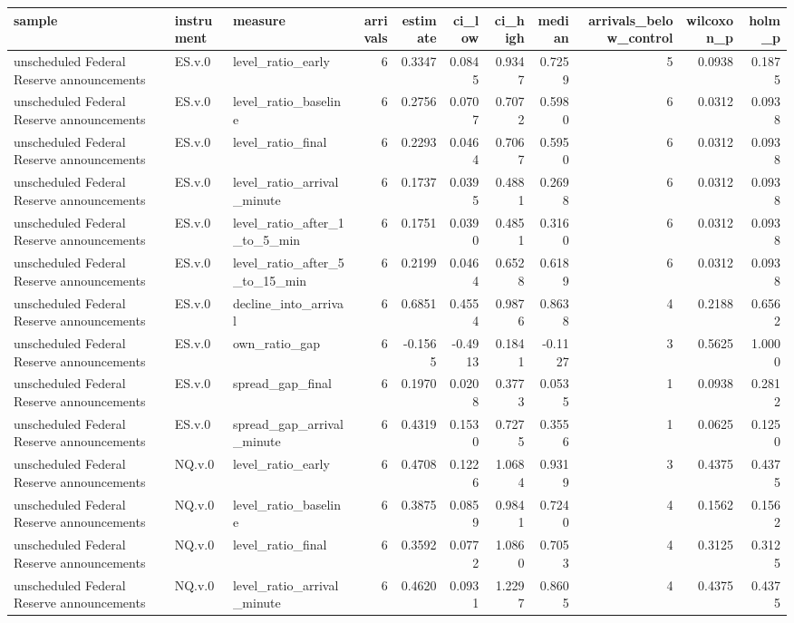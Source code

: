 \begin{tabular}{lllrrrrrrrr}
\toprule
sample & instrument & measure & arrivals & estimate & ci_low & ci_high & median & arrivals_below_control & wilcoxon_p & holm_p \\
\midrule
unscheduled Federal Reserve announcements & ES.v.0 & level_ratio_early & 6 & 0.3347 & 0.0845 & 0.9347 & 0.7259 & 5 & 0.0938 & 0.1875 \\
unscheduled Federal Reserve announcements & ES.v.0 & level_ratio_baseline & 6 & 0.2756 & 0.0707 & 0.7072 & 0.5980 & 6 & 0.0312 & 0.0938 \\
unscheduled Federal Reserve announcements & ES.v.0 & level_ratio_final & 6 & 0.2293 & 0.0464 & 0.7067 & 0.5950 & 6 & 0.0312 & 0.0938 \\
unscheduled Federal Reserve announcements & ES.v.0 & level_ratio_arrival_minute & 6 & 0.1737 & 0.0395 & 0.4881 & 0.2698 & 6 & 0.0312 & 0.0938 \\
unscheduled Federal Reserve announcements & ES.v.0 & level_ratio_after_1_to_5_min & 6 & 0.1751 & 0.0390 & 0.4851 & 0.3160 & 6 & 0.0312 & 0.0938 \\
unscheduled Federal Reserve announcements & ES.v.0 & level_ratio_after_5_to_15_min & 6 & 0.2199 & 0.0464 & 0.6528 & 0.6189 & 6 & 0.0312 & 0.0938 \\
unscheduled Federal Reserve announcements & ES.v.0 & decline_into_arrival & 6 & 0.6851 & 0.4554 & 0.9876 & 0.8638 & 4 & 0.2188 & 0.6562 \\
unscheduled Federal Reserve announcements & ES.v.0 & own_ratio_gap & 6 & -0.1565 & -0.4913 & 0.1841 & -0.1127 & 3 & 0.5625 & 1.0000 \\
unscheduled Federal Reserve announcements & ES.v.0 & spread_gap_final & 6 & 0.1970 & 0.0208 & 0.3773 & 0.0535 & 1 & 0.0938 & 0.2812 \\
unscheduled Federal Reserve announcements & ES.v.0 & spread_gap_arrival_minute & 6 & 0.4319 & 0.1530 & 0.7275 & 0.3556 & 1 & 0.0625 & 0.1250 \\
unscheduled Federal Reserve announcements & NQ.v.0 & level_ratio_early & 6 & 0.4708 & 0.1226 & 1.0684 & 0.9319 & 3 & 0.4375 & 0.4375 \\
unscheduled Federal Reserve announcements & NQ.v.0 & level_ratio_baseline & 6 & 0.3875 & 0.0859 & 0.9841 & 0.7240 & 4 & 0.1562 & 0.1562 \\
unscheduled Federal Reserve announcements & NQ.v.0 & level_ratio_final & 6 & 0.3592 & 0.0772 & 1.0860 & 0.7053 & 4 & 0.3125 & 0.3125 \\
unscheduled Federal Reserve announcements & NQ.v.0 & level_ratio_arrival_minute & 6 & 0.4620 & 0.0931 & 1.2297 & 0.8605 & 4 & 0.4375 & 0.4375 \\

\end{tabular}
